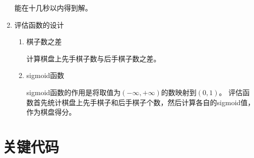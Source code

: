 \documentclass[10pt,letterpaper]{ctexart}
\begin{document}
\begin{enumerate}[itemindent=2.5em,label=\arabic*、]
    能在十几秒以内得到解。
    \item 评估函数的设计
      \begin{enumerate}[itemindent=2.5em,label=(\arabic*)]
        \item 棋子数之差
        \par \qquad 计算棋盘上先手棋子数与后手棋子数之差。
        \item sigmoid函数
        \par \qquad sigmoid函数的作用是将取值为$(-\infty, +\infty)$的数映射到$(0, 1)$。
        评估函数首先统计棋盘上先手棋子和后手棋子个数，然后计算各自的sigmoid值，作为棋盘得分。
      \end{enumerate}
\end{enumerate}

\section{关键代码}
\end{document}
